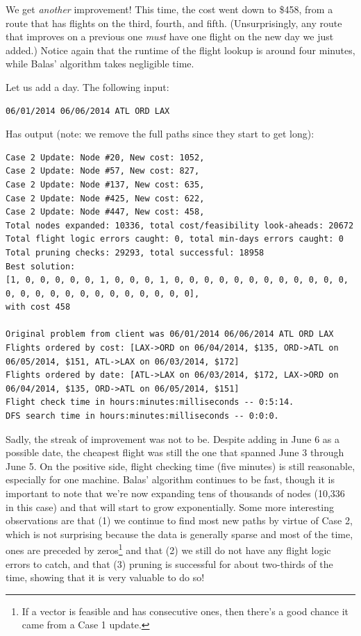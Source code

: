 \documentclass{article}
\begin{document}
We get \emph{another} improvement! This time, the cost went down to \$458, from a route that has flights on the third, fourth, and fifth.
(Unsurprisingly, any route that improves on a previous one \emph{must} have one flight on the new day we just added.) Notice again that the runtime of
the flight lookup is around four minutes, while Balas' algorithm takes negligible time.

Let us add a day. The following input:

\begin{verbatim}
06/01/2014 06/06/2014 ATL ORD LAX
\end{verbatim}

Has output (note: we remove the full paths since they start to get long):

\scriptsize
\begin{verbatim}
Case 2 Update: Node #20, New cost: 1052, 
Case 2 Update: Node #57, New cost: 827, 
Case 2 Update: Node #137, New cost: 635, 
Case 2 Update: Node #425, New cost: 622, 
Case 2 Update: Node #447, New cost: 458, 
Total nodes expanded: 10336, total cost/feasibility look-aheads: 20672
Total flight logic errors caught: 0, total min-days errors caught: 0
Total pruning checks: 29293, total successful: 18958
Best solution:
[1, 0, 0, 0, 0, 0, 1, 0, 0, 0, 1, 0, 0, 0, 0, 0, 0, 0, 0, 0, 0, 0, 0, 0, 0, 0, 0, 0, 0, 0, 0, 0, 0, 0, 0, 0],
with cost 458

Original problem from client was 06/01/2014 06/06/2014 ATL ORD LAX
Flights ordered by cost: [LAX->ORD on 06/04/2014, $135, ORD->ATL on 06/05/2014, $151, ATL->LAX on 06/03/2014, $172]
Flights ordered by date: [ATL->LAX on 06/03/2014, $172, LAX->ORD on 06/04/2014, $135, ORD->ATL on 06/05/2014, $151]
Flight check time in hours:minutes:milliseconds -- 0:5:14.
DFS search time in hours:minutes:milliseconds -- 0:0:0.
\end{verbatim}
\normalsize

Sadly, the streak of improvement was not to be. Despite adding in June 6 as a possible date, the cheapest flight was still the one that spanned June 3
through June 5. On the positive side, flight checking time (five minutes) is still reasonable, especially for one machine. Balas' algorithm continues
to be fast, though it is important to note that we're now expanding tens of thousands of nodes (10,336 in this case) and that will start to grow
exponentially. Some more interesting observations are that (1) we continue to find most new paths by virtue of Case 2, which is not surprising because
the data is generally sparse and most of the time, ones are preceded by zeros\footnote{If a vector is feasible and has consecutive ones, then there's
a good chance it came from a Case 1 update.} and that (2) we still do not have any flight logic errors to catch, and that (3) pruning is successful
for about two-thirds of the time, showing that it is very valuable to do so!
\end{document}
